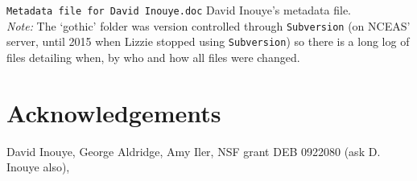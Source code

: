 \documentclass[11pt,a4paper]{article}
\begin{document}
\verb|Metadata file for David Inouye.doc| David Inouye's metadata
file. \\

\emph{Note:} The `gothic' folder was version controlled through \verb|Subversion| (on
NCEAS' server, until 2015 when Lizzie stopped using \verb|Subversion|) so there is a long log of files detailing when, by who
and how all files were changed. 

\section{Acknowledgements}
David Inouye, George Aldridge, Amy Iler, NSF grant DEB 0922080 (ask D. Inouye also), 
\end{document}
